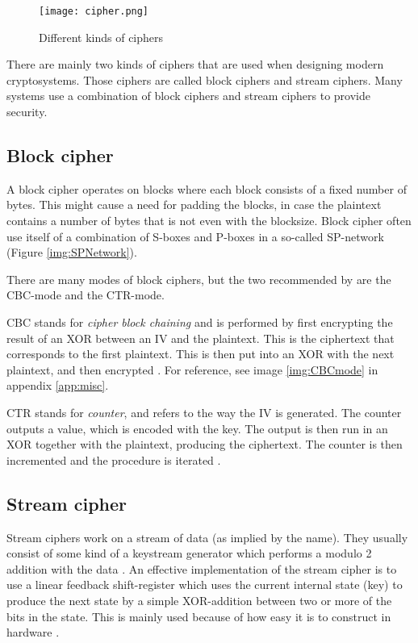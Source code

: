 \begin{figure}
  \texttt{[image: cipher.png]}
  \caption{Different kinds of ciphers \citep{CipherTax:2013}}
  \label{img:ciphers}
\end{figure}

There are mainly two kinds of ciphers that are used when designing modern 
cryptosystems. Those ciphers are called block ciphers and stream ciphers. 
Many systems use a combination of block ciphers and stream ciphers to provide 
security. 

\subsection{Block cipher}\label{sec:BlockCipher}
A block cipher operates on blocks where each block consists of a fixed number 
of bytes. This might cause a need for padding the blocks, in case the plaintext 
contains a number of bytes that is not even with the blocksize. Block cipher 
often use itself of a combination of S-boxes and P-boxes in a so-called 
SP-network (Figure \ref{img:SPNetwork}).

There are many modes of block ciphers, but the two recommended by 
\citet{Schneier:2003} are the CBC-mode and the CTR-mode.

CBC stands for \emph{cipher block chaining} and is performed by first encrypting 
the result of an XOR between an IV and the plaintext. This is the ciphertext 
that corresponds to the first plaintext. This is then put into an XOR with the 
next plaintext, and then encrypted \citep[pp. 109--111]{Stinson:2006}. For 
reference, see image \ref{img:CBCmode} in appendix \ref{app:misc}.

CTR stands for \emph{counter}, and refers to the way the IV is generated. The
counter outputs a value, which is encoded with the key. The output is then run 
in an XOR together with the plaintext, producing the ciphertext. The counter is 
then incremented and the procedure is iterated \citep[p. 111]{Stinson:2006}.

\subsection{Stream cipher} \label{sec:StreamCipher}
Stream ciphers work on a stream of data (as implied by the name). They usually 
consist of some kind of a keystream generator which performs a modulo 2 addition
with the data \cite[pp. 67]{Simmons:1992}. An effective implementation of the 
stream cipher is to use a linear feedback shift-register which uses the current 
internal state (key) to produce the next state by a simple XOR-addition between 
two or more of the bits in the state. This is mainly used because of how easy
it is to construct in hardware \citep{LFSR:2008}.

